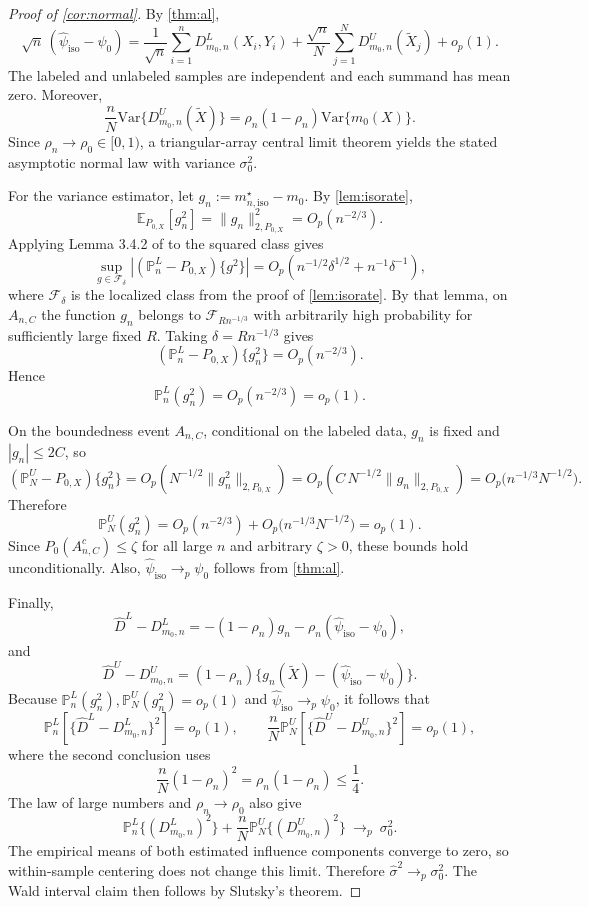 \documentclass{article}
\theoremstyle{plain}
\theoremstyle{definition}
\newcommand{\E}{\mathbb{E}}
\newcommand{\Var}{\mathrm{Var}}
\newcommand{\1}{\mathbbm{1}}
\newcommand{\rhozero}{\rho_0}
\newcommand{\rhon}{\rho_n}
\newcommand{\Pl}{\mathbb{P}^{L}_n}
\newcommand{\Pu}{\mathbb{P}^{U}_N}
\newcommand{\Px}{P_{0,X}}
\begin{document}
\begin{proof}[Proof of \cref{cor:normal}]
By \cref{thm:al},
\[
\sqrt n\,(\widehat{\psi}_{\mathrm{iso}}-\psi_0)
=
\frac{1}{\sqrt n}\sum_{i=1}^n D_{m_0,n}^L(X_i,Y_i)
+
\frac{\sqrt n}{N}\sum_{j=1}^N D_{m_0,n}^U(\widetilde X_j)
+
o_p(1).
\]
The labeled and unlabeled samples are independent and each summand has mean zero. Moreover,
\[
\frac{n}{N}\Var\{D_{m_0,n}^U(\widetilde X)\}
=
\rhon(1-\rhon)\Var\{m_0(X)\}.
\]
Since \(\rhon\to\rhozero\in[0,1)\), a triangular-array central limit theorem yields the stated asymptotic normal law with variance \(\sigma_0^2\).

For the variance estimator, let \(g_n:=m_{n,\mathrm{iso}}^\star-m_0\). By \cref{lem:isorate},
\[
\E_{\Px}[g_n^2]=\|g_n\|_{2,\Px}^2=O_p(n^{-2/3}).
\]
Applying Lemma 3.4.2 of \citet{vdvwellner1996} to the squared class gives
\[
\sup_{g\in\mathcal F_\delta}|(\Pl-\Px)\{g^2\}|
=O_p\!\left(n^{-1/2}\delta^{1/2}+n^{-1}\delta^{-1}\right),
\]
where \(\mathcal F_\delta\) is the localized class from the proof of \cref{lem:isorate}. By that lemma, on \(A_{n,C}\) the function \(g_n\) belongs to \(\mathcal F_{Rn^{-1/3}}\) with arbitrarily high probability for sufficiently large fixed \(R\). Taking \(\delta=Rn^{-1/3}\) gives
\[
(\Pl-\Px)\{g_n^2\}=O_p(n^{-2/3}).
\]
Hence
\[
\Pl(g_n^2)=O_p(n^{-2/3})=o_p(1).
\]

On the boundedness event \(A_{n,C}\), conditional on the labeled data, \(g_n\) is fixed and \(|g_n|\le 2C\), so
\[
(\Pu-\Px)\{g_n^2\}
=
O_p\left(N^{-1/2}\|g_n^2\|_{2,\Px}\right)
=
O_p\left(C\,N^{-1/2}\|g_n\|_{2,\Px}\right)
=
O_p\bigl(n^{-1/3}N^{-1/2}\bigr).
\]
Therefore
\[
\Pu(g_n^2)=O_p(n^{-2/3})+O_p\bigl(n^{-1/3}N^{-1/2}\bigr)=o_p(1).
\]
Since \(P_0(A_{n,C}^c)\le \zeta\) for all large \(n\) and arbitrary \(\zeta>0\), these bounds hold unconditionally. Also, \(\widehat{\psi}_{\mathrm{iso}}\to_p\psi_0\) follows from \cref{thm:al}.

Finally,
\[
\widehat D^L-D_{m_0,n}^L
=
-(1-\rhon)g_n-\rhon(\widehat{\psi}_{\mathrm{iso}}-\psi_0),
\]
and
\[
\widehat D^U-D_{m_0,n}^U
=
(1-\rhon)\{g_n(\widetilde X)-(\widehat{\psi}_{\mathrm{iso}}-\psi_0)\}.
\]
Because \(\Pl(g_n^2),\Pu(g_n^2)=o_p(1)\) and \(\widehat{\psi}_{\mathrm{iso}}\to_p\psi_0\), it follows that
\[
\Pl\!\left[\{\widehat D^L-D_{m_0,n}^L\}^2\right]=o_p(1),
\qquad
\frac{n}{N}\Pu\!\left[\{\widehat D^U-D_{m_0,n}^U\}^2\right]=o_p(1),
\]
where the second conclusion uses
\[
\frac{n}{N}(1-\rhon)^2=\rhon(1-\rhon)\le \frac14.
\]
The law of large numbers and \(\rhon\to\rhozero\) also give
\[
\Pl\{(D_{m_0,n}^L)^2\}
+
\frac{n}{N}\Pu\{(D_{m_0,n}^U)^2\}
\ \to_p\ \sigma_0^2.
\]
The empirical means of both estimated influence components converge to zero,
so within-sample centering does not change this limit.
Therefore \(\widehat\sigma^2\to_p \sigma_0^2\). The Wald interval claim then follows by Slutsky's theorem.
\end{proof}
\end{document}
